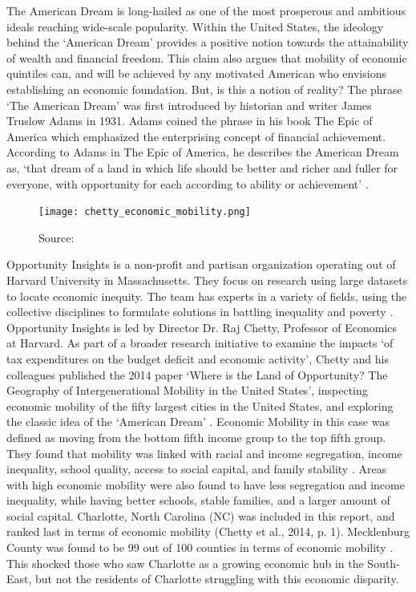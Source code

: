 
The American Dream is long-hailed as one of the most prosperous and ambitious ideals reaching wide-scale popularity. Within the United States, the ideology behind the `American Dream' provides a positive notion towards the attainability of wealth and financial freedom. 
This claim also argues that mobility of economic quintiles can, and will be achieved by any motivated American who envisions establishing an economic foundation. But, is this a notion of reality? 
The phrase `The American Dream' was first introduced by historian and writer James Truslow Adams in 1931. Adams coined the phrase in his book The Epic of America which emphasized the enterprising concept of financial achievement. 
According to Adams in The Epic of America, he describes the American Dream as, `that dream of a land in which life should be better and richer and fuller for everyone, with opportunity for each according to ability or achievement' \parencite{adams2017}.
\begin{figure}
    \caption{Source: \cite{opportunityinsights}}
    \texttt{[image: chetty\_economic\_mobility.png]}
    \label{fig1}
\end{figure}






Opportunity Insights is a non-profit and partisan organization operating out of Harvard University in Massachusetts. They focus on research using large datasets to locate economic inequity. 
The team has experts in a variety of fields, using the collective disciplines to formulate solutions in battling inequality and poverty \parencite{opportunityinsights}.
Opportunity Insights is led by Director Dr. Raj Chetty, Professor of Economics at Harvard. 
As part of a broader research initiative to examine the impacts `of  tax  expenditures  on  the  budget  deficit  and  economic  activity', Chetty and his colleagues published the 2014 paper `Where is the Land of Opportunity? The Geography of Intergenerational Mobility in the United States', inspecting economic mobility of the fifty largest cities in the United States, and exploring the classic idea of the `American Dream' \parencite{opportunityinsights, chetty2014}.
Economic Mobility in this case was defined as moving from the bottom fifth income group to the top fifth group. 
They found that mobility was linked with racial and income segregation, income inequality, school quality, access to social capital, and family stability \parencite{chetty2014}.
Areas with high economic mobility were also found to have less segregation and income inequality, while having better schools, stable families, and a larger amount of social capital\parencite{chetty2014}.
Charlotte, North Carolina (NC) was included in this report, and ranked last in terms of economic mobility (Chetty et al., 2014, p. 1). Mecklenburg County was found to be 99 out of 100 counties in terms of economic mobility \parencite{opportunityinsights}. This shocked those who saw Charlotte as a growing economic hub in the South-East, but not the residents of Charlotte struggling with this economic disparity. 

